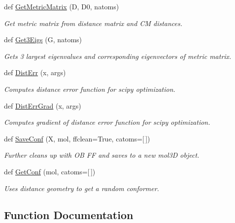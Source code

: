 \begin{DoxyCompactItemize}
def \hyperlink{namespacemolSimplify_1_1Scripts_1_1distgeom_a4cab2a5d58e3b87a21782fe674644556}{Get\+Metric\+Matrix} (D, D0, natoms)
\begin{DoxyCompactList}\small\item\em Get metric matrix from distance matrix and CM distances. \end{DoxyCompactList}\item 
def \hyperlink{namespacemolSimplify_1_1Scripts_1_1distgeom_ae35bf82aac3a079973c82389260e6437}{Get3\+Eigs} (G, natoms)
\begin{DoxyCompactList}\small\item\em Gets 3 largest eigenvalues and corresponding eigenvectors of metric matrix. \end{DoxyCompactList}\item 
def \hyperlink{namespacemolSimplify_1_1Scripts_1_1distgeom_ac30129928233e408ea43718d61a583c1}{Dist\+Err} (x, args)
\begin{DoxyCompactList}\small\item\em Computes distance error function for scipy optimization. \end{DoxyCompactList}\item 
def \hyperlink{namespacemolSimplify_1_1Scripts_1_1distgeom_a577069dfbb0c54289330e26d385cae55}{Dist\+Err\+Grad} (x, args)
\begin{DoxyCompactList}\small\item\em Computes gradient of distance error function for scipy optimization. \end{DoxyCompactList}\item 
def \hyperlink{namespacemolSimplify_1_1Scripts_1_1distgeom_a2930b926314c9aca7d5a27808147eb03}{Save\+Conf} (X, mol, ffclean=True, catoms=\mbox{[}$\,$\mbox{]})
\begin{DoxyCompactList}\small\item\em Further cleans up with OB FF and saves to a new mol3D object. \end{DoxyCompactList}\item 
def \hyperlink{namespacemolSimplify_1_1Scripts_1_1distgeom_ab4b658be4a3b69023b662b3268e73f66}{Get\+Conf} (mol, catoms=\mbox{[}$\,$\mbox{]})
\begin{DoxyCompactList}\small\item\em Uses distance geometry to get a random conformer. \end{DoxyCompactList}\end{DoxyCompactItemize}


\subsection{Function Documentation}
\mbox{\label{namespacemolSimplify_1_1Scripts_1_1distgeom_a755cf7c0dbe32d75e3aa2c43ce1b8093}} 
